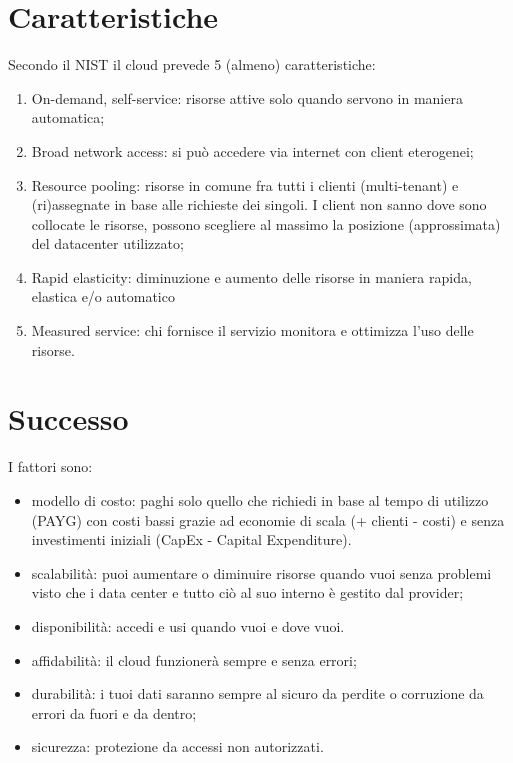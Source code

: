 \documentclass[
]{article}
\providecommand{\tightlist}{%
  \setlength{\itemsep}{0pt}\setlength{\parskip}{0pt}}
\begin{document}
{}

\section{\texorpdfstring{{Caratteristiche}}{Caratteristiche}}\label{h.b44wxi9l58r8}

{Secondo il NIST il cloud prevede 5 (almeno) caratteristiche:}

\begin{enumerate}
\tightlist
\item
  {On-demand, self-service}{: risorse attive solo quando servono in
  maniera automatica;}
\item
  {Broad network access}{: si può accedere via internet con client
  eterogenei;}
\item
  {Resource pooling}{: risorse in comune fra tutti i clienti
  (multi-tenant) e (ri)assegnate in base alle richieste dei singoli. I
  client non sanno dove sono collocate le risorse, possono scegliere al
  massimo la posizione (approssimata) del datacenter utilizzato;}
\item
  {Rapid elasticity}{: diminuzione e aumento delle risorse in maniera
  rapida, elastica e/o automatico}
\item
  {Measured service}{: chi fornisce il servizio monitora e ottimizza
  l'uso delle risorse.}
\end{enumerate}

{}

\section{\texorpdfstring{{Successo}}{Successo}}\label{h.ihbpafyt88tx}

{I fattori sono:}

\begin{itemize}
\tightlist
\item
  {modello di costo}{: paghi solo quello che richiedi in base al tempo
  di utilizzo (PAYG) con costi bassi grazie ad economie di scala (+
  clienti - costi) e senza investimenti iniziali (CapEx - Capital
  Expenditure).}
\item
  {scalabilità}{: puoi aumentare o diminuire risorse quando vuoi senza
  problemi visto che i data center e tutto ciò al suo interno è gestito
  dal provider;}
\item
  {disponibilità}{: accedi e usi quando vuoi e dove vuoi.}
\item
  {affidabilità}{: il cloud funzionerà sempre e senza errori;}
\item
  {durabilità}{: i tuoi dati saranno sempre al sicuro da perdite o
  corruzione da errori da fuori e da dentro;}
\item
  {sicurezza}{: protezione da accessi non autorizzati.}
\end{itemize}
\end{document}

